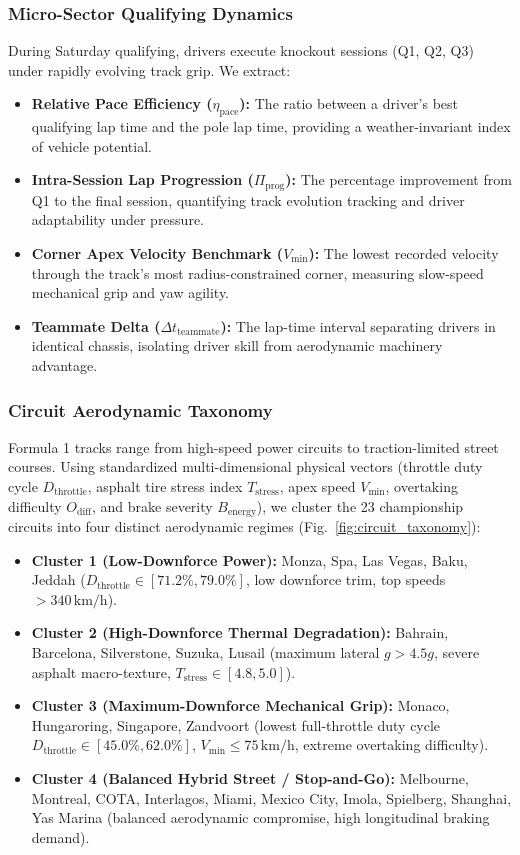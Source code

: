 \documentclass[journal]{IEEEtran}
\begin{document}
\subsubsection{Micro-Sector Qualifying Dynamics}
During Saturday qualifying, drivers execute knockout sessions (Q1, Q2, Q3) under rapidly evolving track grip. We extract:
\begin{itemize}
    \item \textbf{Relative Pace Efficiency ($\eta_{\text{pace}}$):} The ratio between a driver's best qualifying lap time and the pole lap time, providing a weather-invariant index of vehicle potential.
    \item \textbf{Intra-Session Lap Progression ($\Pi_{\text{prog}}$):} The percentage improvement from Q1 to the final session, quantifying track evolution tracking and driver adaptability under pressure.
    \item \textbf{Corner Apex Velocity Benchmark ($V_{\text{min}}$):} The lowest recorded velocity through the track's most radius-constrained corner, measuring slow-speed mechanical grip and yaw agility.
    \item \textbf{Teammate Delta ($\Delta t_{\text{teammate}}$):} The lap-time interval separating drivers in identical chassis, isolating driver skill from aerodynamic machinery advantage.
\end{itemize}

\subsubsection{Circuit Aerodynamic Taxonomy}
Formula 1 tracks range from high-speed power circuits to traction-limited street courses. Using standardized multi-dimensional physical vectors (throttle duty cycle $D_{\text{throttle}}$, asphalt tire stress index $T_{\text{stress}}$, apex speed $V_{\text{min}}$, overtaking difficulty $O_{\text{diff}}$, and brake severity $B_{\text{energy}}$), we cluster the 23 championship circuits into four distinct aerodynamic regimes (Fig.~\ref{fig:circuit_taxonomy}):
\begin{itemize}
    \item \textbf{Cluster 1 (Low-Downforce Power):} Monza, Spa, Las Vegas, Baku, Jeddah ($D_{\text{throttle}} \in [71.2\%, 79.0\%]$, low downforce trim, top speeds $> 340\,\text{km/h}$).
    \item \textbf{Cluster 2 (High-Downforce Thermal Degradation):} Bahrain, Barcelona, Silverstone, Suzuka, Lusail (maximum lateral $g > 4.5g$, severe asphalt macro-texture, $T_{\text{stress}} \in [4.8, 5.0]$).
    \item \textbf{Cluster 3 (Maximum-Downforce Mechanical Grip):} Monaco, Hungaroring, Singapore, Zandvoort (lowest full-throttle duty cycle $D_{\text{throttle}} \in [45.0\%, 62.0\%]$, $V_{\text{min}} \le 75\,\text{km/h}$, extreme overtaking difficulty).
    \item \textbf{Cluster 4 (Balanced Hybrid Street / Stop-and-Go):} Melbourne, Montreal, COTA, Interlagos, Miami, Mexico City, Imola, Spielberg, Shanghai, Yas Marina (balanced aerodynamic compromise, high longitudinal braking demand).
\end{itemize}
\end{document}
